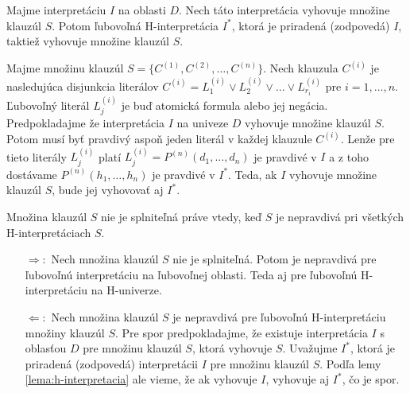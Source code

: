 \begin{lema}
    \label{lema:h-interpretacia}
    Majme interpretáciu $I$ na oblasti $D$. Nech táto interpretácia
    vyhovuje množine klauzúl $S$. Potom ľubovoľná H-interpretácia $I^*$,
    ktorá je priradená (zodpovedá) $I$, taktiež vyhovuje množine klauzúl $S$.
\end{lema}

\begin{dokaz}
    Majme množinu klauzúl $S=\{C^{(1)}, C^{(2)}, \ldots , C^{(n)}\}$.
    Nech klauzula $C^{(i)}$ je nasledujúca disjunkcia literálov
    $C^{(i)} = L^{(i)}_1 \lor L^{(i)}_2 \lor \ldots \lor
        L^{(i)}_{r_i}$ pre $i=1,\ldots,n$.
    Ľubovoľný literál $L^{(i)}_j$ je buď atomická formula alebo
    jej negácia. Predpokladajme že interpretácia $I$ na univeze $D$
    vyhovuje množine klauzúl $S$. Potom musí byť pravdivý aspoň jeden
    literál v každej klauzule $C^{(i)}$.
    Lenže pre tieto literály
    $L^{(i)}_j$ platí
    $L^{(i)}_j = P^{(n)}(d_1,\dots,d_n)$ je pravdivé v $I$ a z toho
    dostávame $P^{(n)}(h_1, \dots, h_n)$ je pravdivé v $I^*$.
    Teda, ak $I$ vyhovuje množine klauzúl $S$, bude jej vyhovovať aj
    $I^*$.
    \\
\end{dokaz}

\begin{veta}
    Množina klauzúl $S$ nie je splniteľná práve vtedy,
    keď $S$ je nepravdivá pri všetkých H-interpretáciach $S$.
\end{veta}


\begin{dokaz}
    \noindent
    \begin{itemize}
    \item[$\Rightarrow:$] Nech množina klauzúl $S$ nie je splniteľná.
        Potom je nepravdivá pre ľubovoľnú interpretáciu na ľubovoľnej
        oblasti.
        Teda aj pre ľubovoľnú H-interpretáciu na H-univerze.

    \item[$\Leftarrow:$] Nech množina klauzúl $S$ je nepravdivá pre
        ľubovoľnú H-interpretáciu množiny klauzúl $S$.
        Pre spor predpokladajme, že existuje interpretácia $I$ 
        s oblasťou $D$ pre množinu klauzúl $S$, ktorá
        vyhovuje $S$.
        Uvažujme $I^*$, ktorá je priradená (zodpovedá) interpretácii
        $I$ pre množinu klauzúl $S$.
        Podľa lemy \ref{lema:h-interpretacia} ale vieme,
        že ak vyhovuje $I$, vyhovuje aj $I^*$, čo je spor.
    \end{itemize}
\end{dokaz}

